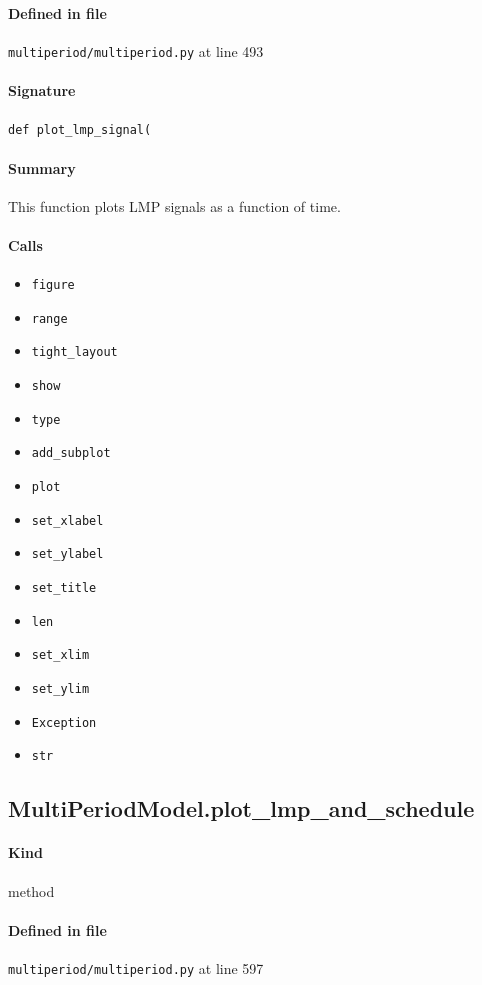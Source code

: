 \documentclass[11pt]{report}
\begin{document}
\paragraph{Defined in file} \texttt{multiperiod/multiperiod.py} at line 493
\paragraph{Signature} \texttt{def plot\_lmp\_signal(}
\paragraph{Summary} This function plots LMP signals as a function of time.
\paragraph{Calls}
\begin{itemize}[leftmargin=*]
  \item \texttt{figure}
  \item \texttt{range}
  \item \texttt{tight\_layout}
  \item \texttt{show}
  \item \texttt{type}
  \item \texttt{add\_subplot}
  \item \texttt{plot}
  \item \texttt{set\_xlabel}
  \item \texttt{set\_ylabel}
  \item \texttt{set\_title}
  \item \texttt{len}
  \item \texttt{set\_xlim}
  \item \texttt{set\_ylim}
  \item \texttt{Exception}
  \item \texttt{str}
\end{itemize}
\subsection{MultiPeriodModel.plot\_lmp\_and\_schedule}
\label{def:multiperiod-multiperiod.py:MultiPeriodModel.plot_lmp_and_schedule:L597}
\paragraph{Kind} method
\paragraph{Defined in file} \texttt{multiperiod/multiperiod.py} at line 597
\end{document}
